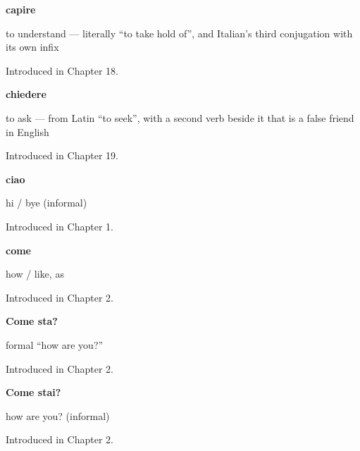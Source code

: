 \noindent\begin{minipage}[t]{\linewidth}
\raggedright
\textbf{capire}\par
\small to understand — literally \textquotedblleft{}to take hold of\textquotedblright{}, and Italian's third conjugation with its own infix\par
\footnotesize Introduced in Chapter 18.
\end{minipage}\par\medskip

\noindent\begin{minipage}[t]{\linewidth}
\raggedright
\textbf{chiedere}\par
\small to ask — from Latin \textquotedblleft{}to seek\textquotedblright{}, with a second verb beside it that is a false friend in English\par
\footnotesize Introduced in Chapter 19.
\end{minipage}\par\medskip

\noindent\begin{minipage}[t]{\linewidth}
\raggedright
\textbf{ciao}\par
\small hi / bye (informal)\par
\footnotesize Introduced in Chapter 1.
\end{minipage}\par\medskip

\noindent\begin{minipage}[t]{\linewidth}
\raggedright
\textbf{come}\par
\small how / like, as\par
\footnotesize Introduced in Chapter 2.
\end{minipage}\par\medskip

\noindent\begin{minipage}[t]{\linewidth}
\raggedright
\textbf{Come sta?}\par
\small formal “how are you?”\par
\footnotesize Introduced in Chapter 2.
\end{minipage}\par\medskip

\noindent\begin{minipage}[t]{\linewidth}
\raggedright
\textbf{Come stai?}\par
\small how are you? (informal)\par
\footnotesize Introduced in Chapter 2.
\end{minipage}\par\medskip


